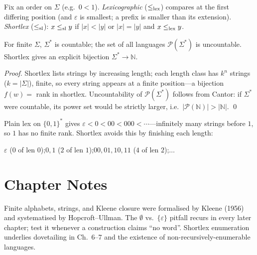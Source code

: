 \begin{definition}
Fix an order on $\Sigma$ (e.g.\ $0<1$). \emph{Lexicographic} ($\le_{\rm lex}$) compares at the first differing position (and $\varepsilon$ is smallest; a prefix is smaller than its extension). \emph{Shortlex} ($\le_{\rm sl}$): $x\le_{\rm sl}y$ if $|x|<|y|$ or $|x|=|y|$ and $x\le_{\rm lex}y$.
\end{definition}

\begin{theorem}[Countability]
For finite $\Sigma$, $\Sigma^*$ is countable; the set of all languages $\mathcal{P}(\Sigma^*)$ is uncountable. Shortlex gives an explicit bijection $\Sigma^*\to\mathbb{N}$.
\end{theorem}
\begin{proof}
Shortlex lists strings by increasing length; each length class has $k^n$ strings ($k=|\Sigma|$), finite, so every string appears at a finite position---a bijection $f(w)=$ rank in shortlex. Uncountability of $\mathcal{P}(\Sigma^*)$ follows from Cantor: if $\Sigma^*$ were countable, its power set would be strictly larger, i.e.\ $|\mathcal{P}(\mathbb{N})|>|\mathbb{N}|$. \qed
\end{proof}

\begin{example}
Plain lex on $\{0,1\}^*$ gives $\varepsilon<0<00<000<\cdots$---infinitely many strings before $1$, so $1$ has no finite rank.
Shortlex avoids this by finishing each length:
\begin{center}
$\varepsilon$ ($0$ of len $0$);\quad $0,1$ ($2$ of len $1$);\quad $00,01,10,11$ ($4$ of len $2$);\quad $\dots$
\end{center}
\end{example}

\section{Chapter Notes}
Finite alphabets, strings, and Kleene closure were formalised by Kleene (1956) and systematised by Hopcroft--Ullman. The $\emptyset$ vs.\ $\{\varepsilon\}$ pitfall recurs in every later chapter; test it whenever a construction claims ``no word''. Shortlex enumeration underlies dovetailing in Ch.~6--7 and the existence of non-recursively-enumerable languages.

